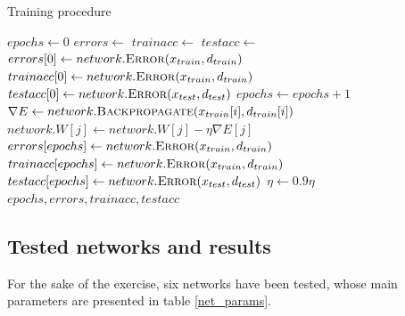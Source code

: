 \documentclass[letterpaper,headings=standardclasses]{scrartcl}
\begin{document}
\begin{algorithm}[H]
    \caption{Training procedure}
    \label{tralg}
    \begin{algorithmic}
    
        \State {}
        \State $epochs \gets 0$
        \State $errors \gets $ 
        \State $trainacc \gets $ 
        \State $testacc \gets $ 
        \State $errors[0] \gets network.\Call{Error}{x_{train}, d_{train}}$
        \State $trainacc[0] \gets network.\Call{Error}{x_{train}, d_{train}}$
        \State $testacc[0] \gets network.\Call{Error}{x_{test}, d_{test}}$
        \State {}
            \State $epochs \gets epochs + 1$
            \State {}
                \State $\nabla E \gets network.\Call{Backpropagate}{x_{train}[i], d_{train}[i]}$
                    \State $network.W[j] \gets network.W[j] - \eta \nabla E[j]$
                \EndFor
            \EndFor
            \State {}
            \State $errors[epochs] \gets network.\Call{Error}{x_{train}, d_{train}}$
            \State $trainacc[epochs] \gets network.\Call{Error}{x_{train}, d_{train}}$
            \State $testacc[epochs] \gets network.\Call{Error}{x_{test}, d_{test}}$
            \State {}
                \State $\eta \gets 0.9 \eta$
            \EndIf
        \EndWhile
        \State \Return $epochs, errors, trainacc, testacc$
    \EndFunction
    
    \end{algorithmic}
\end{algorithm}

\subsection{Tested networks and results}

For the sake of the exercise, six networks have been tested, whose main parameters are presented in table \ref{net_params}.
\end{document}
